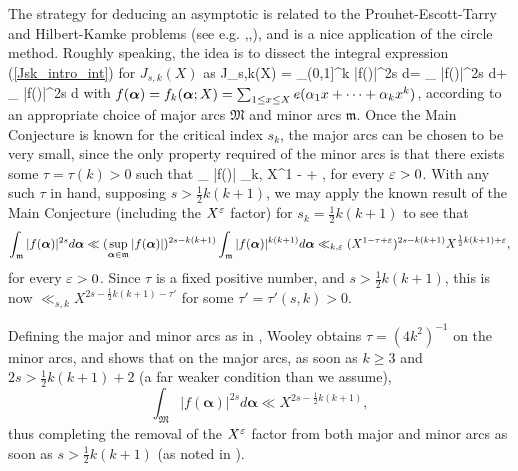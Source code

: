 \documentclass[brochure,english,12pt]{bourbaki}%
\newcommand{\albf}{\boldsymbol\alpha}
\begin{document}
The strategy for deducing an asymptotic is related to the Prouhet-Escott-Tarry and Hilbert-Kamke problems (see e.g. \cite[\S X.3]{Hua65},\cite[Ch. 3]{ACK04},\cite{Woo96}), and is a nice application of the circle method.
Roughly speaking, the idea is to dissect the integral expression (\ref{Jsk_intro_int}) for $J_{s,k}(X)$ as
\beq\label{J_int}
 J_{s,k}(X)  = \int_{(0,1]^k}  |f(\albf)|^{2s} d\albf = \int_{}  |f(\albf)|^{2s} d\albf+ \int_{}  |f(\albf)|^{2s} d\albf
 \eeq
with $f(\albf)  = f_k(\albf;X) = \sum_{1 \leq x \leq X} e(\al_1 x + \cdots + \al_k x^k)$, according to 
 an appropriate choice of major arcs $\mathfrak{M}$ and minor arcs $\mathfrak{m}$.
Once the Main Conjecture is known for the critical index $s_k$, the major arcs can be chosen to be very small, since the only property required of the minor arcs is that there exists some $\tau = \tau(k)>0$ such that 
 \beq\label{Wooley1}
 \sup_{\albf \in {}} |f(\albf)| \ll_{k,\ep} X^{1 - \tau + \ep} ,
 \eeq
 for every $\varepsilon>0$.
 With any such $\tau$ in hand, supposing $s > \frac{1}{2}k(k+1)$, we may apply the known result of the  Main Conjecture (including the $X^\varepsilon$ factor)
  for $s_k = \frac{1}{2}k(k+1)$ to see that
 \[ \int_{\mathfrak{m}} |f(\albf)|^{2s} d\albf \ll (\sup_{\albf \in \mathfrak{m}} |f(\albf)|)^{2s -k(k+1)} \int_{\mathfrak{m}} |f(\albf)|^{k(k+1)} d\albf
	\ll_{k,\ep} (X^{1 - \tau +\ep})^{2s - k(k+1)} X^{\frac{1}{2}k(k+1)+\ep},
\]
for every $\varepsilon>0$.
Since $\tau$ is a fixed positive number, and $s>\frac{1}{2}k(k+1)$, this is now  $\ll_{s,k} X^{2s - \frac{1}{2}k(k+1) - \tau'}$ for some $\tau'  = \tau'(s,k)>0$.
 


Defining the major and minor arcs as in \cite[Eqn. (7.1), Lemma 7.1]{Woo17a}, Wooley obtains $\tau= (4k^2)^{-1}$ on the minor arcs, and shows that on the major arcs, as soon as $k \geq 3$ and $2s> \frac{1}{2}k(k+1)+2$ (a far weaker condition than we assume), 
\[
 \int_{\mathfrak{M}} |f(\albf)|^{2s} d\albf  \ll X^{2s - \frac{1}{2}k(k+1)},
\]
thus completing the removal of the $X^\varepsilon$ factor from both major and minor arcs as soon as $s > \frac{1}{2}k(k+1)$ (as noted in \cite[\S 5]{BDG16}). 
\end{document}
